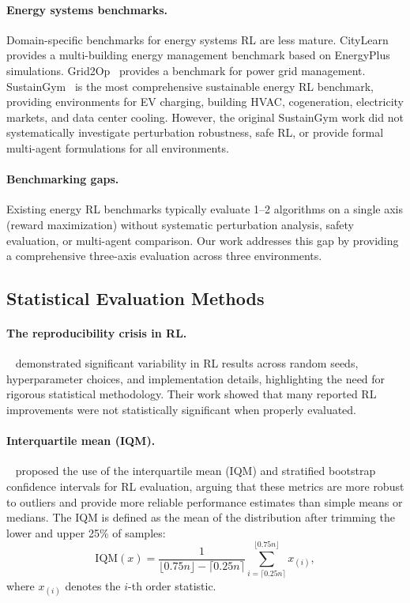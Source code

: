 \paragraph{Energy systems benchmarks.} Domain-specific benchmarks for energy systems RL are less mature. CityLearn~\citep{vazquezcanteli2020citylearn} provides a multi-building energy management benchmark based on EnergyPlus simulations. Grid2Op~\citep{donnot2020grid2op} provides a benchmark for power grid management. SustainGym~\citep{yeh2023sustaingym} is the most comprehensive sustainable energy RL benchmark, providing environments for EV charging, building HVAC, cogeneration, electricity markets, and data center cooling. However, the original SustainGym work did not systematically investigate perturbation robustness, safe RL, or provide formal multi-agent formulations for all environments.

\paragraph{Benchmarking gaps.} Existing energy RL benchmarks typically evaluate 1--2 algorithms on a single axis (reward maximization) without systematic perturbation analysis, safety evaluation, or multi-agent comparison. Our work addresses this gap by providing a comprehensive three-axis evaluation across three environments.

\subsection{Statistical Evaluation Methods}

\paragraph{The reproducibility crisis in RL.}~\citet{henderson2018matters} demonstrated significant variability in RL results across random seeds, hyperparameter choices, and implementation details, highlighting the need for rigorous statistical methodology. Their work showed that many reported RL improvements were not statistically significant when properly evaluated.

\paragraph{Interquartile mean (IQM).}~\citet{agarwal2021deep} proposed the use of the interquartile mean (IQM) and stratified bootstrap confidence intervals for RL evaluation, arguing that these metrics are more robust to outliers and provide more reliable performance estimates than simple means or medians. The IQM is defined as the mean of the distribution after trimming the lower and upper 25\% of samples:
\begin{equation}
    \text{IQM}(x) = \frac{1}{\lfloor 0.75n \rfloor - \lceil 0.25n \rceil} \sum_{i=\lceil 0.25n \rceil}^{\lfloor 0.75n \rfloor} x_{(i)},
\end{equation}
where $x_{(i)}$ denotes the $i$-th order statistic.

